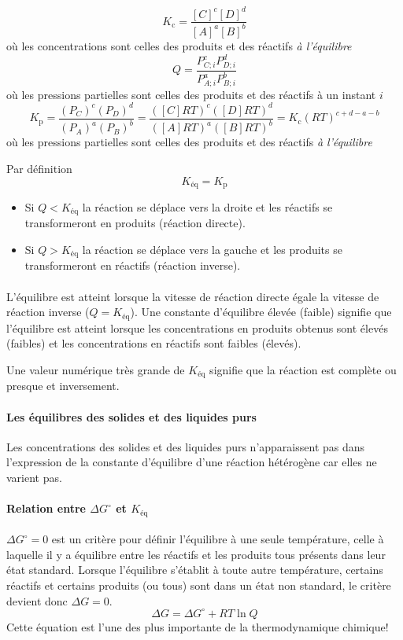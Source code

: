 \documentclass[11pt,a4paper,french]{article}
\newcommand\kc{\ensuremath{K_{\mathrm{c}}}}
\newcommand\kp{\ensuremath{K_{\mathrm{p}}}}
\newcommand\keq{\ensuremath{K_{\mathrm{éq}}}}
\begin{document}
$$\kc=\frac{[C]^c[D]^d}{[A]^{a}[B]^b}$$
où les concentrations sont celles des produits et des réactifs \emph{à l'équilibre}
$$Q=\frac{P_{C;i}^cP_{D;i}^d}{P_{A;i}^{a}P_{B;i}^b}$$
où les pressions partielles sont celles des produits et des réactifs à un instant $i$
$$\kp=\frac{(P_C)^{c}(P_D)^{d}}{(P_A)^{a}(P_B)^b}=
\frac{([C]RT)^{c}([D]RT)^{d}}{([A]RT)^{a}([B]RT)^b}=\kc(RT)^{c + d - a - b}$$
où les pressions partielles sont celles des produits et des réactifs \emph{à l'équilibre}

Par définition
\[ \keq = \kp \]

\begin{itemize}
\item Si $Q<\keq$ la réaction se déplace vers la droite et les réactifs se transformeront en produits (réaction directe).
\item Si $Q>\keq$ la réaction se déplace vers la gauche et les produits se transformeront en réactifs (réaction inverse).
\end{itemize}

\paragraph{}
L'équilibre est atteint lorsque la vitesse de réaction directe égale la vitesse de réaction inverse ($Q=\keq$).
Une constante d'équilibre élevée (faible) signifie que l'équilibre est atteint lorsque les concentrations en produits obtenus sont élevés (faibles) et les concentrations en réactifs sont faibles (élevés).

Une valeur numérique très grande de $\keq$ signifie que la réaction est complète ou presque et inversement.

\paragraph{Les équilibres des solides et des liquides purs} Les concentrations des solides et des liquides purs n'apparaissent pas dans l'expression de la constante d'équilibre d'une réaction hétérogène car elles ne varient pas.

\paragraph{Relation entre $\Delta G^{\circ}$ et $\keq$}
$\Delta G^{\circ}=0$ est un critère pour définir l'équilibre à une seule température, celle à laquelle il y a équilibre entre les réactifs et les produits tous présents dans leur état standard.
Lorsque l'équilibre s'établit à toute autre température, certains réactifs et certains produits (ou tous) sont dans un état non standard, le critère devient donc $\Delta G = 0$.
$$\Delta G=\Delta G^{\circ}+RT\ln Q$$
Cette équation est l'une des plus importante de la thermodynamique chimique!
\end{document}
